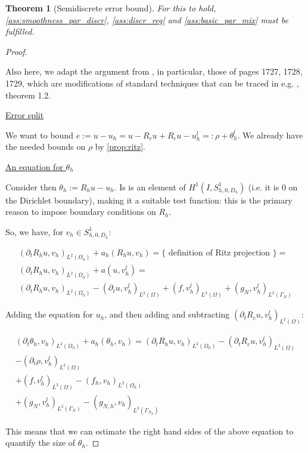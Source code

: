 \documentclass[english,a4paper,9pt,oneside]{scrbook}	%
\theoremstyle{break}
\newtheorem{thm}[equation]{Theorem}
\newenvironment{mproof}[1][\proofname]{%
  \begin{proof}[#1]$ $\par\nobreak\ignorespaces
}{%
  \end{proof}
}
\renewcommand*{\proofname}{Proof}
\theoremstyle{remark}
\newcommand{\ind}[1]{\{\text{ #1 }\}}
\begin{document}
\begin{appendices}
\begin{thm}[Semidiscrete error bound]
For this to hold, \cref{ass:smoothness_par_discr}, \cref{ass:discr_reg} and \cref{ass:basic_par_mix} must be fulfilled.

\end{thm}

\begin{mproof}

Also here, we adapt the argument from \cite{ranner}, in particular, those of pages 1727, 1728, 1729, which are modifications of standard techniques that can be traced in e.g. \cite{thomee}, theorem 1.2.

\underline{Error split}

We want to bound $e:=u-u_h = u-R_cu +R_c u -u_h^l =: \rho + \theta_h^l$. We already have the needed bounds on $\rho$ by \cref{prop:ritz}.

\underline{An equation for $\theta_h$}

Consider then $\theta_h := R_h u -u_h$. Is is an element of $H^1(I,S^1_{h,0,D_h})$ (i.e. it is $0$ on the Dirichlet boundary), making it a suitable test function: this is the primary reason to impose boundary conditions on $R_h$.

So, we have, for $v_h \in S^1_{h,0,D_h}$:

\begin{align*}
(\partial_t R_h u , v_h)_{L^2(\Omega_h)} + a_h(R_h u, v_h) = \ind{definition of Ritz projection}=\\
(\partial_t R_h u , v_h)_{L^2(\Omega_h)} + a(u, v_h^l) =\\
(\partial_t R_h u , v_h)_{L^2(\Omega_h)} - (\partial_t u, v_h^l)_{L^2(\Omega)} + (f, v_h^l)_{L^2(\Omega)} + (g_{N}, v_h^l)_{L^2(\Gamma_{N})} 
\end{align*}

Adding the equation for $u_h$, and then adding and subtracting $(\partial_t R_cu, v_h^l)_{L^2(\Omega)}$:


\begin{align}
\label{eqn:theta}
(\partial_t \theta_h , v_h)_{L^2(\Omega_h)} + a_h(\theta_h, v_h) = 
(\partial_t R_h u , v_h)_{L^2(\Omega_h)} - (\partial_t R_c u , v_h^l)_{L^2(\Omega)}\\
- (\partial_t \rho, v_h^l)_{L^2(\Omega)}\\ + (f, v_h^l)_{L^2(\Omega)} - (f_h, v_h)_{L^2(\Omega_h)}\\ + (g_{N}, v_h^l)_{L^2(\Gamma_{N})} - (g_{N,h}, v_h)_{L^2(\Gamma_{N_h})} 
\end{align}

This means that we can estimate the right hand sides of the above equation to quantify the size of $\theta_h$.


\end{mproof}
\end{appendices}
\end{document}
